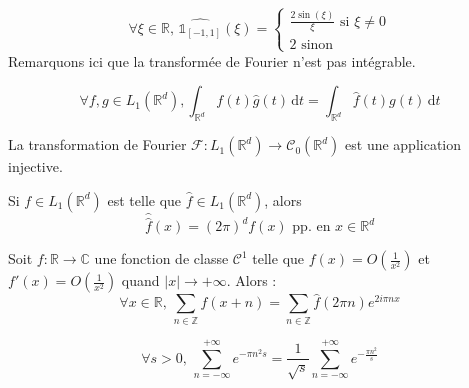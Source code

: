 	\begin{example}
		\[
		\forall \xi \in \mathbb{R}, \, \widehat{\mathbb{1}_{[-1,1]}}(\xi) =
		\begin{cases}
			\frac{2 \sin(\xi)}{\xi} \text{ si } \xi \neq 0 \\
			2 \text{ sinon}
		\end{cases}
		\]
		Remarquons ici que la transformée de Fourier n'est pas intégrable.
	\end{example}

	\begin{theorem}
		\[ \forall f, g \in L_1(\mathbb{R}^d), \int_{\mathbb{R}^d} f(t) \widehat{g}(t) \, \mathrm{d}t = \int_{\mathbb{R}^d} \widehat{f}(t) g(t) \, \mathrm{d}t \]
	\end{theorem}

	\begin{corollary}
		La transformation de Fourier $\mathcal{F} : L_1(\mathbb{R}^d) \rightarrow \mathcal{C}_0(\mathbb{R}^d)$ est une application injective.
	\end{corollary}

	\begin{theorem}
		Si $f \in L_1(\mathbb{R}^d)$ est telle que $\widehat{f} \in L_1(\mathbb{R}^d)$, alors
		\[ \widehat{\widehat{f}}(x) = (2\pi)^d f(x) \text{ pp. en } x \in \mathbb{R}^d \]
	\end{theorem}


	\begin{theorem}
		Soit $f : \mathbb{R} \rightarrow \mathbb{C}$ une fonction de classe $\mathcal{C}^1$ telle que $f(x) = O \left( \frac{1}{x^2} \right)$ et $f'(x) = O \left( \frac{1}{x^2} \right)$ quand $|x| \longrightarrow +\infty$. Alors :
		\[ \forall x \in \mathbb{R}, \, \sum_{n \in \mathbb{Z}} f(x+n) = \sum_{n \in \mathbb{Z}} \widehat{f}(2 \pi n) e^{2 i \pi n x} \]
	\end{theorem}

	\begin{application}
		\[ \forall s > 0, \, \sum_{n=-\infty}^{+\infty} e^{-\pi n^2 s} = \frac{1}{\sqrt{s}} \sum_{n=-\infty}^{+\infty} e^{-\frac{\pi n^2}{s}} \]
	\end{application}

